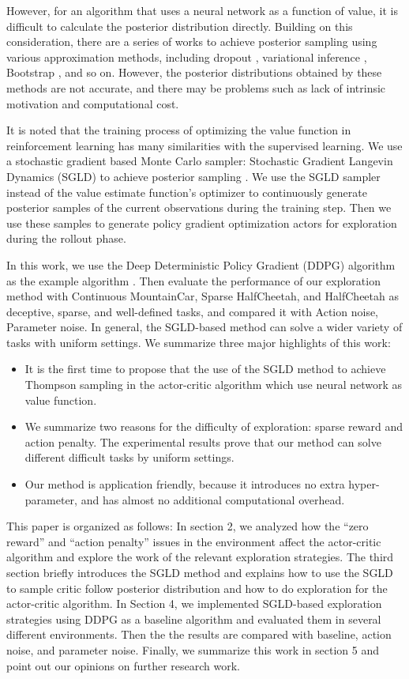 However, for an algorithm that uses a neural network as a function of value, it is difficult to calculate the posterior distribution directly. Building on this consideration, there are a series of works to achieve posterior sampling using various approximation methods, including dropout \cite{dropoutInference}, variational inference \cite{VIME}, Bootstrap \cite{BDQN}, and so on. However, the posterior distributions obtained by these methods are not accurate, and there may be problems such as lack of intrinsic motivation and computational cost. \cite{osband2018randomized}

It is noted that the training process of optimizing the value function in reinforcement learning has many similarities with the supervised learning. We use a stochastic gradient based Monte Carlo sampler: Stochastic Gradient Langevin Dynamics (SGLD) to achieve posterior sampling \cite{SGLD}. We use the SGLD sampler instead of the value estimate function's optimizer to continuously generate posterior samples of the current observations during the training step. Then we use these samples to generate policy gradient optimization actors for exploration during the rollout phase.

In this work, we use the Deep Deterministic Policy Gradient (DDPG) algorithm as the example algorithm \cite{DDPG}. Then evaluate the performance of our exploration method with Continuous MountainCar, Sparse HalfCheetah, and HalfCheetah as deceptive, sparse, and well-defined tasks, and compared it with Action noise, Parameter noise. In general, the SGLD-based method can solve a wider variety of tasks with uniform settings. We summarize three major highlights of this work:
\begin{itemize}
\item  It is the first time to propose that the use of the SGLD method to achieve Thompson sampling in the actor-critic algorithm which use neural network as value function.
\item We summarize two reasons for the difficulty of exploration: sparse reward and action penalty. The experimental results prove that our method can solve different difficult tasks by uniform settings.
\item  Our method is application friendly, because it introduces no extra hyper-parameter, and has almost no additional computational overhead. 
\end{itemize} 

This paper is organized as follows: In section 2, we analyzed how the “zero reward” and “action penalty” issues in the environment affect the actor-critic algorithm and explore the work of the relevant exploration strategies. The third section briefly introduces the SGLD method and explains how to use the SGLD to sample critic follow posterior distribution and how to do exploration for the actor-critic algorithm. In Section 4, we implemented SGLD-based exploration strategies using DDPG as a baseline algorithm and evaluated them in several different environments. Then the the results are compared with baseline, action noise, and parameter noise. Finally, we summarize this work in section 5 and point out our opinions on further research work.
